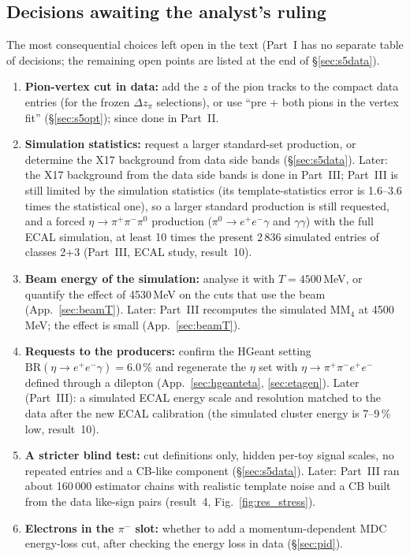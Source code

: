 \documentclass[11pt,a4paper]{article}
\newcommand{\pim}{\ensuremath{\pi^{-}}\xspace}
\newcommand{\piz}{\ensuremath{\pi^{0}}\xspace}
\newcommand{\ee}{\ensuremath{e^{+}e^{-}}\xspace}
\newcommand{\pipi}{\ensuremath{\pi^{+}\pi^{-}}\xspace}
\newcommand{\ppee}{\ensuremath{\pi^{+}\pi^{-}e^{+}e^{-}}\xspace}
\begin{document}
\subsection{Decisions awaiting the analyst's ruling}
\label{sec:resdec}
The most consequential choices left open in the text (Part~I has no separate table of decisions; the remaining open
points are listed at the end of \S\ref{sec:s5data}).
\begin{enumerate}\setlength{\itemsep}{1pt}
\item \textbf{Pion-vertex cut in data:} add the $z$ of the pion tracks to the compact data entries (for the frozen
      $\Delta z_\pi$ selections), or use ``pre + both pions in the vertex fit'' (\S\ref{sec:s5opt}); since done in Part~II.
\item \textbf{Simulation statistics:} request a larger standard-set production, or determine the X17 background from
      data side bands (\S\ref{sec:s5data}). Later: the X17 background from the data side bands is done in Part~III; Part~III
      is still limited by the simulation statistics (its template-statistics error is 1.6--3.6 times the statistical one), so
      a larger standard production is still requested, and a forced $\eta\to\pipi\piz$ production ($\piz\to\ee\gamma$ and
      $\gamma\gamma$) with the full ECAL simulation, at least 10 times the present 2\,836 simulated entries of classes 2+3 (Part~III, ECAL
      study, result~10).
\item \textbf{Beam energy of the simulation:} analyse it with $T = 4500$\,MeV, or quantify the effect of 4530\,MeV on the
      cuts that use the beam (App.~\ref{sec:beamT}). Later: Part~III recomputes the simulated $\mathrm{MM}_4$ at
      4500\,MeV; the effect is small (App.~\ref{sec:beamT}).
\item \textbf{Requests to the producers:} confirm the HGeant setting $\mathrm{BR}(\eta\to\ee\gamma) = 6.0$\,\% and
      regenerate the $\eta$ set with $\eta\to\ppee$ defined through a dilepton (App.~\ref{sec:hgeanteta},
      \ref{sec:etagen}). Later (Part~III): a simulated ECAL energy scale and resolution matched to the data after the new
      ECAL calibration (the simulated cluster energy is 7--9\,\% low, result~10).
\item \textbf{A stricter blind test:} cut definitions only, hidden per-toy signal scales, no repeated entries and a CB-like
      component (\S\ref{sec:s5data}). Later: Part~III ran about 160\,000 estimator chains with realistic template noise and
      a CB built from the data like-sign pairs (result~4, Fig.~\ref{fig:res_stress}).
\item \textbf{Electrons in the \pim slot:} whether to add a momentum-dependent MDC energy-loss cut, after checking the
      energy loss in data (\S\ref{sec:pid}).
\end{enumerate}
\end{document}
